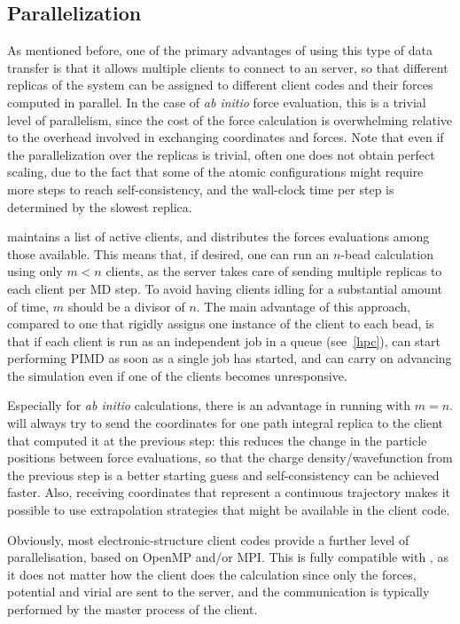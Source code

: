 \documentclass[11pt,english,fleqn]{report}
\begin{document}
\subsection{Parallelization}

As mentioned before, one of the primary advantages of using this type
of data transfer is that it allows multiple clients to connect
to an \ipi server, so that different replicas of the system can be
assigned to different client codes and their forces computed in parallel.
In the case of \emph{ab initio} force evaluation, this is a trivial
level of parallelism, since the cost of the force calculation
is overwhelming relative to the overhead involved in exchanging 
coordinates and forces. Note that even if the parallelization over
the replicas is trivial, often one does not obtain perfect scaling,
due to the fact that some of the atomic configurations might require
more steps to reach self-consistency, and the wall-clock time per step
is determined by the slowest replica.

\ipi maintains a list of active clients, and distributes the forces
evaluations among those available. This means that, if desired, one 
can run an $n$-bead calculation using only $m<n$ clients, as the 
server takes care of sending multiple replicas to each client per 
MD step. To avoid having clients idling for a substantial amount
of time, $m$ should be a divisor of $n$. The main advantage of 
this approach, compared to one that rigidly assigns one instance of
the client to each bead, is that if each client is run as an independent
job in a queue (see~\ref{hpc}), \ipi can start performing PIMD
as soon as a single job has started, and can carry on advancing the
simulation even if one of the clients becomes unresponsive.

Especially for \emph{ab initio} calculations, there is an advantage
in running with $m=n$. \ipi will always try to send the coordinates for one
path integral replica to the client that computed it at the previous 
step: this reduces the change in the particle positions between 
force evaluations, so that the charge density/wavefunction from the 
previous step is a better starting guess and self-consistency can be 
achieved faster. Also, receiving coordinates that represent a continuous
trajectory makes it possible to use extrapolation
strategies that might be available in the client code.

Obviously, most electronic-structure client codes provide a further level
of parallelisation, based on OpenMP and/or MPI. This is fully compatible with
\ipi, as it does not matter how the client does the calculation since
only the forces, potential and virial are sent to the server, and the communication
is typically performed by the master process of the client. 
\end{document}
